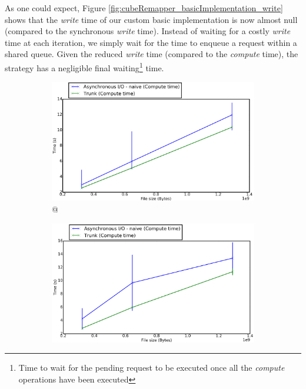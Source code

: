 		As one could expect, Figure \ref{fig:cubeRemapper_basicImplementation_write} shows that the \emph{write} time of our custom basic implementation is now almost null (compared to the synchronous \emph{write} time).   Instead of waiting for a costly \notationIO\space \emph{write} time at each iteration, we simply wait for the time to enqueue a request within a shared queue.   Given the reduced \emph{write} time (compared to the \emph{compute} time), the \notationaio\space strategy has a negligible final waiting\footnote{Time to wait for the pending \notationaio\space request to be executed once all the \emph{compute} operations have been executed} time.\\

			\begin{figure}[!h]
				\centering
				\begin{subfigure}[b]{0.475\textwidth}
					\centering
					\includegraphics[width=\textwidth]{charts/cubeRemapper_basicImplementation_compute_workstation_8core.png}
					\caption[\targetPlatformLaptop \space @ \targetPlatformLaptopFrequency]
					{{\small \targetPlatformLaptop \space @ \targetPlatformLaptopFrequency}}
					\label{fig:cubeRemapper_basicImplementation_compute_workstation_8core}
				\end{subfigure}
				\hfill
				\begin{subfigure}[b]{0.475\textwidth}
					\centering
					\includegraphics[width=\textwidth]{charts/cubeRemapper_basicImplementation_compute_hpc.png}

\end{subfigure}
\end{figure}
